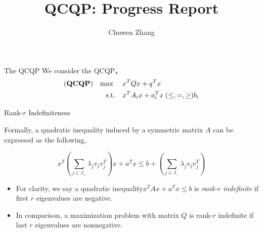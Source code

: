 \documentclass[aspectratio=1610, 10pt]{beamer}
\newcommand{\model}[1]{(\textbf{#1})}
\newcommand{\mx}{\mathbf{\max}\;}
\begin{document}
\title{QCQP: Progress Report}

\author{
  Chuwen Zhang
}


\maketitle
\begin{frame}{The QCQP}
  We consider the QCQP，
  \begin{equation}
    \label{eq:inhoqcqp}
    \begin{aligned}
      \model{QCQP} \quad \mx \quad & x^T Qx + q^T x                                        \\
      \textrm{s.t.} \quad          & x^T A_i x + a_i^T x \hspace{0.27em} (\le, =, \ge) b_i \\
    \end{aligned}
  \end{equation}
\end{frame}
\begin{frame}[allowframebreaks]{Rank-\(r\) Indefiniteness}

  Formally, a quadratic inequality induced by a symmetric matrix \(A\) can be expressed as the following,

  \begin{equation}
    x^T \left(\sum_{j\in J_+} \lambda_j v_jv_j^T\right)x +a^Tx \le b + \left(\sum_{j\in J_-} \lambda_j v_jv_j^T\right)
  \end{equation}

  \begin{itemize}
    \item For clarity, we say a quadratic inequality\(x^TAx + a^Tx \le b\) is \emph{rank-\(r\) indefinite} if first \(r\) eigenvalues are negative.
    \item In comparison, a maximization problem with matrix \(Q\) is rank-\(r\) indefinite if last \(r\) eigenvalues are nonnegative.
  \end{itemize}

\end{frame}
\end{document}
